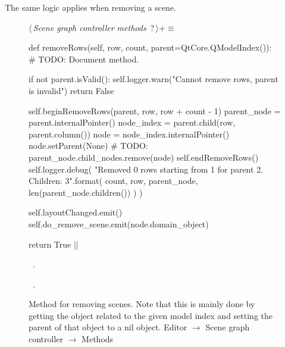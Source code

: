 \documentclass[%
    a4paper,    %
    justified,  %
    nobib,      %
    openany     %
]{tufte-book}
\begin{document}
The same logic applies when removing a scene.

\begin{figure}
\begin{flushleft} \small
\begin{minipage}{\linewidth}\label{scrap52}\raggedright\small
{} $\langle\,${\itshape Scene graph controller methods}\nobreak\ {\footnotesize {?}}$\,\rangle+\equiv$
\vspace{-1ex}
\begin{pythoncode}
def removeRows(self, row, count, parent=QtCore.QModelIndex()):
    # TODO: Document method.

    if not parent.isValid():
        self.logger.warn("Cannot remove rows, parent is invalid")
        return False

    self.beginRemoveRows(parent, row, row + count - 1)
    parent_node = parent.internalPointer()
    node_index = parent.child(row, parent.column())
    node       = node_index.internalPointer()
    node.setParent(None)
    # TODO: parent_node.child_nodes.remove(node)
    self.endRemoveRows()
    self.logger.debug(
        "Removed {0} rows starting from {1} for parent {2}. Children: {3}".format(
            count, row, parent_node, len(parent_node.children())
        )
    )

    self.layoutChanged.emit()
    self.do_remove_scene.emit(node.domain_object)

    return True
|\NWsep|
\end{pythoncode}
\vspace{1.5ex}
\footnotesize
\begin{list}{}{\setlength{\itemsep}{-\parsep}\setlength{\itemindent}{-\leftmargin}}
\item \NWtxtMacroDefBy\ .
\item \NWtxtMacroRefIn\ .

\item{}
\end{list}
\end{minipage}\vspace{4ex}
\end{flushleft}
\caption{Method for removing scenes. Note that this is mainly done by getting
  the object related to the given model index and setting the parent of that
  object to a nil object.
  \newline{}\newline{}Editor $\rightarrow$ Scene graph controller
  $\rightarrow$ Methods}
\label{editor:lst:scene-graph-controller:methods:remove-rows}
\end{figure}
\end{document}
